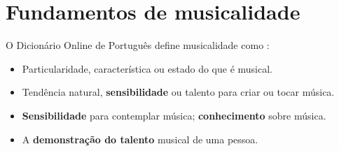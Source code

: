 
\chapter{Fundamentos de musicalidade}

\begin{definition}[Musicalidade:] 
\label{def:Musicalidade}
O Dicionário Online de Português define musicalidade como \cite{diciomusicalidade}:
\begin{itemize}
\item Particularidade, característica ou estado do que é musical.
\item Tendência natural, \textbf{sensibilidade} ou talento para criar ou tocar música.
\item \textbf{Sensibilidade} para contemplar música; \textbf{conhecimento} sobre música.
\item A \textbf{demonstração do talento} musical de uma pessoa.
\end{itemize}
\end{definition}













% 
% 

